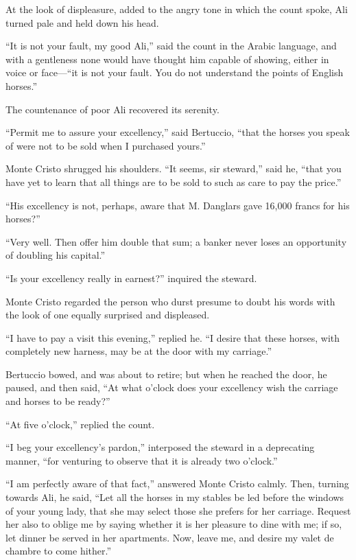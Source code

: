 At the look of displeasure, added to the angry tone in which the count
spoke, Ali turned pale and held down his head.

“It is not your fault, my good Ali,” said the count in the Arabic
language, and with a gentleness none would have thought him capable of
showing, either in voice or face—“it is not your fault. You do not
understand the points of English horses.”

The countenance of poor Ali recovered its serenity.

“Permit me to assure your excellency,” said Bertuccio, “that the horses
you speak of were not to be sold when I purchased yours.”

Monte Cristo shrugged his shoulders. “It seems, sir steward,” said he,
“that you have yet to learn that all things are to be sold to such as
care to pay the price.”

“His excellency is not, perhaps, aware that M. Danglars gave 16,000
francs for his horses?”

“Very well. Then offer him double that sum; a banker never loses an
opportunity of doubling his capital.”

“Is your excellency really in earnest?” inquired the steward.

Monte Cristo regarded the person who durst presume to doubt his words
with the look of one equally surprised and displeased.

“I have to pay a visit this evening,” replied he. “I desire that these
horses, with completely new harness, may be at the door with my
carriage.”

Bertuccio bowed, and was about to retire; but when he reached the door,
he paused, and then said, “At what o’clock does your excellency wish
the carriage and horses to be ready?”

“At five o’clock,” replied the count.

“I beg your excellency’s pardon,” interposed the steward in a
deprecating manner, “for venturing to observe that it is already two
o’clock.”

“I am perfectly aware of that fact,” answered Monte Cristo calmly.
Then, turning towards Ali, he said, “Let all the horses in my stables
be led before the windows of your young lady, that she may select those
she prefers for her carriage. Request her also to oblige me by saying
whether it is her pleasure to dine with me; if so, let dinner be served
in her apartments. Now, leave me, and desire my valet de chambre to
come hither.”

